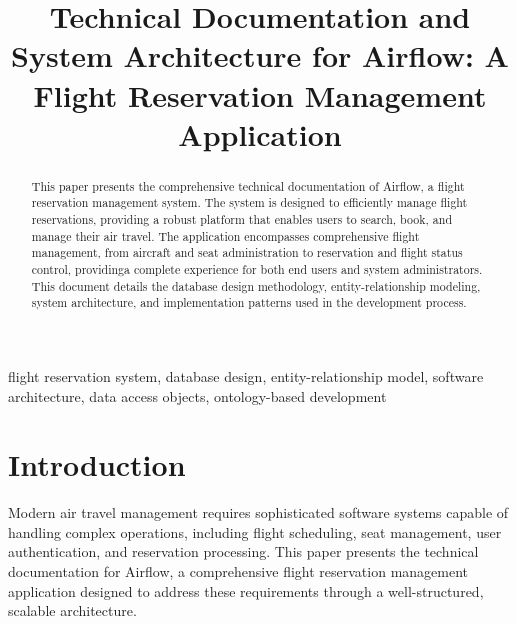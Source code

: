 \documentclass[conference]{IEEEtran}
\begin{document}
    \title{Technical Documentation and System Architecture for Airflow: A Flight Reservation Management Application}

    \author{
    }

    \maketitle

    \begin{abstract}
        This paper presents the comprehensive technical documentation of Airflow, a flight reservation management system. The system is designed to efficiently manage flight reservations, providing a robust platform that enables users to search, book, and manage their air travel. The application encompasses comprehensive flight management, from aircraft and seat administration to reservation and flight status control, providinga complete experience for both end users and system administrators. This document details the database design methodology, entity-relationship modeling, system architecture, and implementation patterns used in the development process.
    \end{abstract}

    \begin{IEEEkeywords}
        flight reservation system, database design, entity-relationship model, software architecture, data access objects, ontology-based development \end{IEEEkeywords}

    \section{Introduction}
    Modern air travel management requires sophisticated software systems capable of handling complex operations, including flight scheduling, seat management, user authentication, and reservation processing. This paper presents the technical documentation for Airflow, a comprehensive flight reservation management application designed to address these requirements through a well-structured, scalable architecture.
\end{document}
